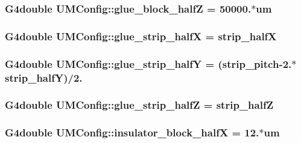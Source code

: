 \subsubsection[{glue\+\_\+block\+\_\+half\+Z}]{\setlength{\rightskip}{0pt plus 5cm}G4double U\+M\+Config\+::glue\+\_\+block\+\_\+half\+Z = 50000.$\ast$um}\label{structUMConfig_a136d2f46047e3459563a35438d86fe1f}
\hypertarget{structUMConfig_ac5c105b2556a33fa698e7e8b82f9b762}{}
\subsubsection[{glue\+\_\+strip\+\_\+half\+X}]{\setlength{\rightskip}{0pt plus 5cm}G4double U\+M\+Config\+::glue\+\_\+strip\+\_\+half\+X = {\bf strip\+\_\+half\+X}}\label{structUMConfig_ac5c105b2556a33fa698e7e8b82f9b762}
\hypertarget{structUMConfig_ad5188e37a8f89f27ba1c90e3ad00ed83}{}
\subsubsection[{glue\+\_\+strip\+\_\+half\+Y}]{\setlength{\rightskip}{0pt plus 5cm}G4double U\+M\+Config\+::glue\+\_\+strip\+\_\+half\+Y = ({\bf strip\+\_\+pitch}-\/2.$\ast${\bf strip\+\_\+half\+Y})/2.}\label{structUMConfig_ad5188e37a8f89f27ba1c90e3ad00ed83}
\hypertarget{structUMConfig_aa70a06439791fd9f4bb81ce2fc342f92}{}
\subsubsection[{glue\+\_\+strip\+\_\+half\+Z}]{\setlength{\rightskip}{0pt plus 5cm}G4double U\+M\+Config\+::glue\+\_\+strip\+\_\+half\+Z = {\bf strip\+\_\+half\+Z}}\label{structUMConfig_aa70a06439791fd9f4bb81ce2fc342f92}
\hypertarget{structUMConfig_aa5646f5b664fb67e9315c46d54690424}{}
\subsubsection[{insulator\+\_\+block\+\_\+half\+X}]{\setlength{\rightskip}{0pt plus 5cm}G4double U\+M\+Config\+::insulator\+\_\+block\+\_\+half\+X = 12.$\ast$um}\label{structUMConfig_aa5646f5b664fb67e9315c46d54690424}
\hypertarget{structUMConfig_a41c70da919e44de22920f7b1704790ca}{}
